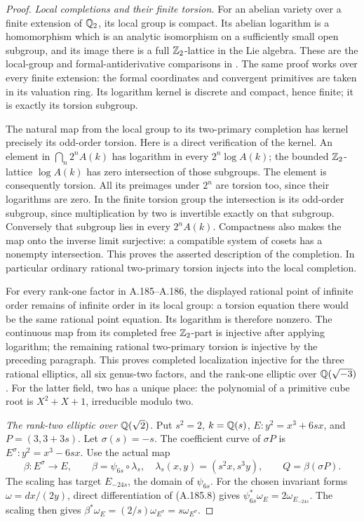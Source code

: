 \begin{proof}
\emph{Local completions and their finite torsion.}
For an abelian variety over a finite extension of
\(\mathbb Q_2\), its local group is compact.  Its abelian
logarithm is a homomorphism which is an analytic
isomorphism on a sufficiently small open subgroup,
and its image there is a full \(\mathbb Z_2\)-lattice in
the Lie algebra.  These are the local-group and
formal-antiderivative comparisons in
\cite[\S4.1 and Remark 4.3, author version pp.3--5]{LegMcCallumPoonenChabauty}.
The same proof works over every finite extension:
the formal coordinates and convergent primitives
are taken in its valuation ring.  Its logarithm
kernel is discrete and compact, hence finite;
it is exactly its torsion subgroup.

The natural map from the local group to its
two-primary completion has kernel precisely its
odd-order torsion.  Here is a direct verification
of the kernel.  An element in \(\bigcap_n2^nA(k)\)
has logarithm in every \(2^n\log A(k)\); the
bounded \(\mathbb Z_2\)-lattice \(\log A(k)\) has
zero intersection of those subgroups.  The element
is consequently torsion.  All its preimages under
\(2^n\) are torsion too, since their logarithms
are zero.  In the finite torsion group the
intersection is its odd-order subgroup,
since multiplication by two is invertible exactly
on that subgroup.  Conversely that subgroup lies
in every \(2^nA(k)\).  Compactness also makes the
map onto the inverse limit surjective: a compatible
system of cosets has a nonempty intersection.
This proves the asserted description of the
completion.  In particular ordinary rational
two-primary torsion injects into the local
completion.

For every rank-one factor in A.185--A.186, the
displayed rational point of infinite order remains
of infinite order in its local group: a torsion
equation there would be the same rational point
equation.  Its logarithm is therefore nonzero.
The continuous map from its completed free
\(\mathbb Z_2\)-part is injective after applying logarithm;
the remaining rational two-primary torsion is
injective by the preceding paragraph.  This proves
completed localization injective for the three
rational elliptics, all six genus-two factors,
and the rank-one elliptic over \(\mathbb Q(\sqrt{-3})\).
For the latter field, two has a unique place:
the polynomial of a primitive cube root is
\(X^2+X+1\), irreducible modulo two.

\emph{The rank-two elliptic over \(\mathbb Q(\sqrt2)\).}
Put \(s^2=2\), \(k=\mathbb Q(s)\),
\(E:y^2=x^3+6sx\), and
\(P=(3,3+3s)\).  Let \(\sigma(s)=-s\).
The coefficient curve of \(\sigma P\) is
\(E^\sigma:y^2=x^3-6sx\).  Use the actual
map
\[
 \beta:E^\sigma\longrightarrow E,
 \qquad
 \beta=\psi_{6s}\circ\lambda_s,
 \quad\lambda_s(x,y)=(s^2x,s^3y),
 \qquad Q=\beta(\sigma P).
\tag{A.190.3}
\]
The scaling has target \(E_{-24s}\), the domain
of \(\psi_{6s}\).  For the chosen invariant
forms \(\omega=dx/(2y)\), direct differentiation
of (A.185.8) gives
\(\psi_{6s}^*\omega_E=2\omega_{E_{-24s}}\).
The scaling then gives
\(\beta^*\omega_E=(2/s)\omega_{E^\sigma}
 =s\omega_{E^\sigma}\).


\end{proof}
